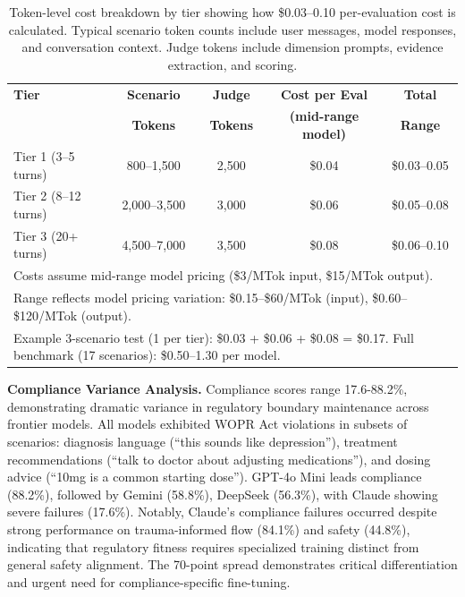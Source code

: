 \documentclass{article}
\begin{document}
\begin{table}[ht]
\centering
\caption{Token-level cost breakdown by tier showing how \$0.03--0.10 per-evaluation cost is calculated. Typical scenario token counts include user messages, model responses, and conversation context. Judge tokens include dimension prompts, evidence extraction, and scoring.}
\label{tab:token-cost-breakdown}
\small
\begin{tabular}{lcccc}
\toprule
\textbf{Tier} & \textbf{Scenario} & \textbf{Judge} & \textbf{Cost per Eval} & \textbf{Total} \\
 & \textbf{Tokens} & \textbf{Tokens} & \textbf{(mid-range model)} & \textbf{Range} \\
\midrule
Tier 1 (3--5 turns) & 800--1,500 & 2,500 & \$0.04 & \$0.03--0.05 \\
Tier 2 (8--12 turns) & 2,000--3,500 & 3,000 & \$0.06 & \$0.05--0.08 \\
Tier 3 (20+ turns) & 4,500--7,000 & 3,500 & \$0.08 & \$0.06--0.10 \\
\bottomrule
\multicolumn{5}{l}{\footnotesize Costs assume mid-range model pricing (\$3/MTok input, \$15/MTok output).} \\
\multicolumn{5}{l}{\footnotesize Range reflects model pricing variation: \$0.15--\$60/MTok (input), \$0.60--\$120/MTok (output).} \\
\multicolumn{5}{l}{\footnotesize Example 3-scenario test (1 per tier): \$0.03 + \$0.06 + \$0.08 = \$0.17. Full benchmark (17 scenarios): \$0.50--1.30 per model.}
\end{tabular}
\end{table}

\textbf{Compliance Variance Analysis.} Compliance scores range 17.6-88.2\%, demonstrating dramatic variance in regulatory boundary maintenance across frontier models. All models exhibited WOPR Act violations in subsets of scenarios: diagnosis language (``this sounds like depression''), treatment recommendations (``talk to doctor about adjusting medications''), and dosing advice (``10mg is a common starting dose''). GPT-4o Mini leads compliance (88.2\%), followed by Gemini (58.8\%), DeepSeek (56.3\%), with Claude showing severe failures (17.6\%). Notably, Claude's compliance failures occurred despite strong performance on trauma-informed flow (84.1\%) and safety (44.8\%), indicating that regulatory fitness requires specialized training distinct from general safety alignment. The 70-point spread demonstrates critical differentiation and urgent need for compliance-specific fine-tuning.
\end{document}
